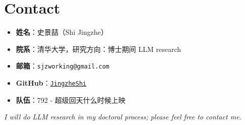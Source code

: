 \documentclass[11pt]{article}
\begin{document}
\section*{Contact}

\begin{itemize}[leftmargin=2em]
  \item \textbf{姓名}：史景喆（Shi Jingzhe）
  \item \textbf{院系}：清华大学，研究方向：博士期间 LLM research
  \item \textbf{邮箱}：\texttt{sjzworking@gmail.com}
  \item \textbf{GitHub}：\href{https://github.com/JingzheShi}{\texttt{JingzheShi}}
  \item \textbf{队伍}：792 - 超级回天什么时候上映
\end{itemize}

\noindent\emph{I will do LLM research in my doctoral process; please feel free to contact me.}
\end{document}
